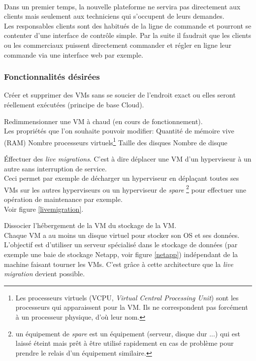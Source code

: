 \paragraph*{}
Dans un premier temps, la nouvelle plateforme ne servira pas directement aux clients mais seulement aux techniciens  qui s'occupent de leurs demandes.\\
Les responsables clients sont des habitués de la ligne de commande et pourront se contenter d'une interface de contrôle simple. Par la suite
il faudrait que les clients ou les commerciaux puissent directement commander et régler en ligne leur commande via une interface web par exemple.

\subsubsection{Fonctionnalités désirées}

\begin{listi}
	\item Créer et supprimer des VMs sans se soucier de l'endroit exact ou elles seront réellement exécutées (principe de base Cloud).
	\item Redimmensionner une VM à chaud (en cours de fonctionnement).\\
		Les propriétés que l'on souhaite pouvoir modifier:
		\subitem Quantité de mémoire vive (RAM)
		\subitem Nombre processeurs virtuels\footnote{Les processeurs virtuels (VCPU, \emph{Virtual Central Processing Unit}) sont les processeurs qui apparaissent
			pour la VM. Ils ne correspondent pas forcément à un processeur physique, d'où leur nom.}
		\subitem Taille des disques
		\subitem Nombre de disque
	\item Éffectuer des \emph{live migrations}. C'est à dire déplacer une VM d'un hyperviseur à un autre sans interruption de service.\\
		Ceci permet par exemple de décharger un hyperviseur en déplaçant toutes ses VMs sur les autres hyperviseurs ou un hyperviseur de \emph{spare}
		\footnote{un équipement de \emph{spare} est un équipement (serveur, disque dur ...) qui est laissé éteint mais prêt à être utilisé rapidement
		en cas de problème pour prendre le relais d'un équipement similaire.} pour effectuer une opération de maintenance par exemple.
		\\
		Voir figure \ref{livemigration}.
	\item Dissocier l'hébergement de la VM du stockage de la VM.\\
		Chaque VM a au moins un disque virtuel pour stocker son OS et ses données. L'objectif est d'utiliser un serveur spécialisé dans le stockage de données
		(par exemple une baie de stockage Netapp, voir figure \ref{netapp}) indépendant de la machine faisant tourner les VMs. C'est grâce à cette architecture que
		la \emph{live migration} devient possible.
\end{listi}

